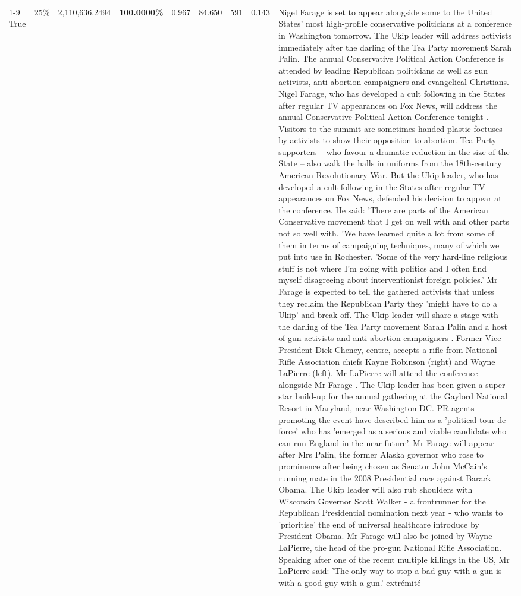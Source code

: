 \begin{table}[H]
\begin{tabular}{lllrlllll}
\cline{1-9} \cline{2-9}
True & 25\% & 2,110,636.2494 & \bfseries \color{red} 100.0000\% & 0.967 & 84.650 & 591 & 0.143 & Nigel Farage is set to appear alongside some to the United States' most high-profile conservative politicians at a conference in Washington tomorrow. The Ukip leader will address activists immediately after the darling of the Tea Party movement Sarah Palin. The annual Conservative Political Action Conference is attended by leading Republican politicians as well as gun activists, anti-abortion campaigners and evangelical Christians. Nigel Farage, who has developed a cult following in the States after regular TV appearances on Fox News, will address the annual Conservative Political Action Conference tonight . Visitors to the summit are sometimes handed plastic foetuses by activists to show their opposition to abortion. Tea Party supporters – who favour a dramatic reduction in the size of the State – also walk the halls in uniforms from the 18th-century American Revolutionary War. But the Ukip leader, who has developed a cult following in the States after regular TV appearances on Fox News, defended his decision to appear at the conference. He said: 'There are parts of the American Conservative movement that I get on well with and other parts not so well with. 'We have learned quite a lot from some of them in terms of campaigning techniques, many of which we put into use in Rochester. 'Some of the very hard-line religious stuff is not where I'm going with politics and I often find myself disagreeing about interventionist foreign policies.' Mr Farage is expected to tell the gathered activists that unless they reclaim the Republican Party they 'might have to do a Ukip' and break off. The Ukip leader will share a stage with the darling of the Tea Party movement Sarah Palin and a host of gun activists and anti-abortion campaigners . Former Vice President Dick Cheney, centre, accepts a rifle from National Rifle Association chiefs Kayne Robinson (right) and Wayne LaPierre (left). Mr LaPierre will attend the conference alongside Mr Farage . The Ukip leader has been given a super-star build-up for the annual gathering at the Gaylord National Resort in Maryland, near Washington DC. PR agents promoting the event have described him as a 'political tour de force' who has 'emerged as a serious and viable candidate who can run England in the near future'. Mr Farage will appear after Mrs Palin, the former Alaska governor who rose to prominence after being chosen as Senator John McCain's running mate in the 2008 Presidential race against Barack Obama. The Ukip leader will also rub shoulders with Wisconsin Governor Scott Walker - a frontrunner for the Republican Presidential nomination next year - who wants to 'prioritise' the end of universal healthcare introduce by President Obama. Mr Farage will also be joined by Wayne LaPierre, the head of the pro-gun National Rifle Association. Speaking after one of the recent multiple killings in the US, Mr LaPierre said: 'The only way to stop a bad guy with a gun is with a good guy with a gun.' extrémité \\

\end{tabular}
\end{table}
